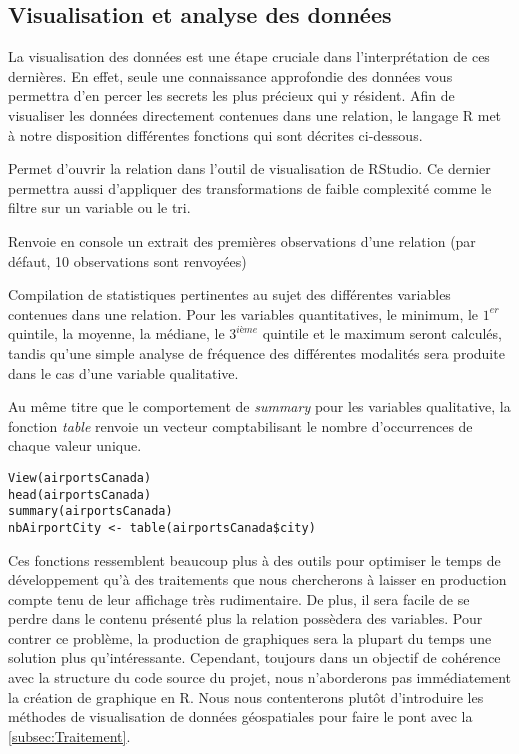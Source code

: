 \subsection{Visualisation et analyse des données}
\label{subsec:Visualisation}

La visualisation des données est une étape cruciale dans l’interprétation de ces dernières. En effet, seule une connaissance approfondie des données vous permettra d'en percer les secrets les plus précieux qui y résident. Afin de visualiser les données directement contenues dans une relation, le langage R met à notre disposition différentes fonctions qui sont décrites ci-dessous. 

\begin{description}[style=multiline,leftmargin=2cm]
		\item[\emph{View}] Permet d'ouvrir la relation dans l'outil de visualisation de RStudio. Ce dernier permettra aussi d'appliquer des transformations de faible complexité comme le filtre sur un variable ou le tri. \cite{Rfunction:View}
		\item[\emph{head}] Renvoie en console un extrait des premières observations d'une relation (par défaut, 10 observations sont renvoyées)
		\item[\emph{summary}] Compilation de statistiques pertinentes au sujet des différentes variables contenues dans une relation. Pour les variables quantitatives, le minimum, le $1^{er}$ quintile, la moyenne, la médiane, le $3^{ième}$ quintile et le maximum seront calculés, tandis qu'une simple analyse de fréquence des différentes modalités sera produite dans le cas d'une variable qualitative.
		\item[\emph{table}] Au même titre que le comportement de \emph{summary} pour les variables qualitative, la fonction \emph{table} renvoie un vecteur comptabilisant le nombre d'occurrences de chaque valeur unique.
\end{description}

\begin{lstlisting}[caption = Fonctions de visualisation de données,label=src:DataVisual]
View(airportsCanada)
head(airportsCanada)
summary(airportsCanada)
nbAirportCity <- table(airportsCanada$city) 
\end{lstlisting}

\vspace{\baselineskip}
\noindent
Ces fonctions ressemblent beaucoup plus à des outils pour optimiser le temps de développement qu'à des traitements que nous chercherons à laisser en production compte tenu de leur affichage très rudimentaire. De plus, il sera facile de se perdre dans le contenu présenté plus la relation possèdera des variables. Pour contrer ce problème, la production de graphiques sera la plupart du temps une solution plus qu'intéressante. Cependant, toujours dans un objectif de cohérence avec la structure du code source du projet, nous n'aborderons pas immédiatement la création de graphique en R. Nous nous contenterons plutôt d'introduire les méthodes de visualisation de données géospatiales pour faire le pont avec la \autoref{subsec:Traitement}.\\

